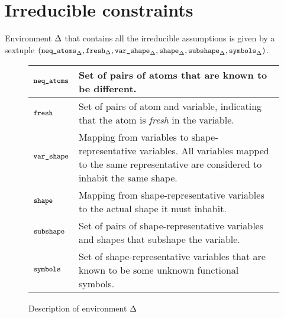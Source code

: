 \documentclass[english, mgr]{iithesis}
\renewcommand{\tt}[1]{\texttt{\small{#1}}}
\renewcommand{\it}[1]{\textit{#1}}
\newcommand{\NeqAtoms}{\tt{neq\_atoms}}
\newcommand{\Fresh}{\tt{fresh}}
\newcommand{\VarShape}{\tt{var\_shape}}
\newcommand{\Shape}{\tt{shape}}
\newcommand{\Subshape}{\tt{subshape}}
\newcommand{\Symbols}{\tt{symbols}}
\begin{document}
\section{Irreducible constraints} \label{sec:solverenv}
Environment $\Delta$ that contains all the irreducible assumptions is given by
a sextuple
$(\NeqAtoms_{\icEnv}
, \Fresh_{\icEnv}
, \VarShape_{\icEnv}
, \Shape_{\icEnv}
, \Subshape_{\icEnv}
, \Symbols_{\icEnv}
)$.
\begin{figure}[h]
  \begin{tabularx}{\textwidth}{|l|X|}
  \hline
    $\NeqAtoms$ & Set of pairs of atoms that are known to be different. \\
  \hline
    $\Fresh$ & Set of pairs of atom and variable, indicating that the atom is \it{fresh} in the variable. \\
  \hline
    $\VarShape$ & Mapping from variables to shape-representative variables. All variables mapped to the same representative are considered to inhabit the same shape. \\
  \hline
    $\Shape$ & Mapping from shape-representative variables to the actual shape it must inhabit. \\
  \hline
    $\Subshape$ & Set of pairs of shape-representative variables and shapes that subshape the variable. \\
  \hline
    $\Symbols$ & Set of shape-representative variables that are known to be some unknown functional symbols. \\
  \hline
  \end{tabularx}
  \caption{Description of environment $\Delta$}
  \label{fig:assumption-equality-rules}
\end{figure}
\end{document}
